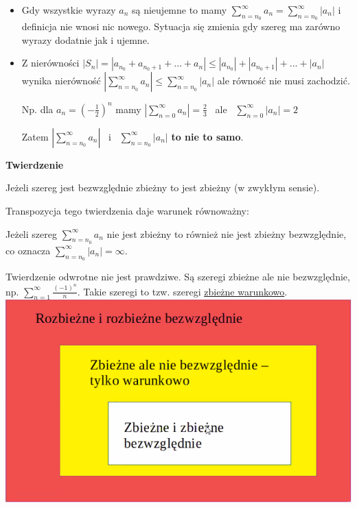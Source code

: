 \begin{itemize}
    \item Gdy wszystkie wyrazy $a_n$ są nieujemne to mamy $\sum\limits_{n=n_0}^{\infty} a_n = \sum\limits_{n=n_0}^{\infty} |a_n|$
    i definicja nie wnosi nic nowego. Sytuacja się zmienia gdy szereg ma zarówno wyrazy dodatnie jak i ujemne.
    \item Z nierówności $|S_n|= |a_{n_0} + a_{n_0+1} + ... + a_n| \leq |a_{n_0}| + |a_{n_0 + 1}| + ... + |a_n| $
    wynika nierówność $ \left| \sum\limits_{n=n_0}^{\infty} a_n \right| \leq \sum\limits_{n=n_0}^{\infty} |a_n| $
    ale równość nie musi zachodzić.

    Np. dla $ a_n = \left( -\frac{1}{2} \right)^n $ mamy $ \left| \sum\limits_{n=0}^{\infty} a_n \right| = \frac{2}{3} $
    \ ale \ $  \sum\limits_{n=0}^{\infty} |a_n| = 2 $

    Zatem $ \left| \sum\limits_{n=n_0}^{\infty} a_n \right| $ \ i \ $ \sum\limits_{n=n_0}^{\infty} |a_n| $ \textbf{to nie to samo}. \\
\end{itemize}

\textbf{Twierdzenie}

Jeżeli szereg jest bezwzględnie zbieżny to jest zbieżny (w zwykłym sensie).

Transpozycja tego twierdzenia daje warunek równoważny:

Jeżeli szereg $ \sum\limits_{n = n_0}^{\infty} a_n $ nie jest zbieżny to również nie jest zbieżny bezwzględnie, co oznacza
$ \sum\limits_{n=n_0}^{\infty} |a_n| = \infty $.

Twierdzenie odwrotne nie jest prawdziwe. Są szeregi zbieżne ale nie bezwzględnie, np.
$ \sum\limits_{n=1}^{\infty} \frac{(-1)^n}{n} $. Takie szeregi to tzw. szeregi \underline{zbieżne warunkowo}. \\

\includegraphics[scale=0.6]{rozbiezneirozbiezne.png} \\

